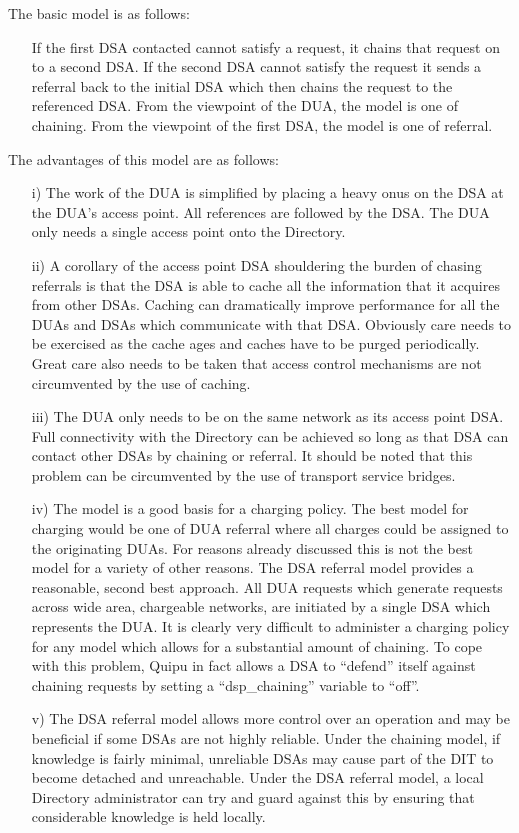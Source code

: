 The basic model is as follows:
\begin{itemize}
\item[{}]
If the first DSA contacted cannot satisfy a request, it chains that request
on to a second DSA.  If the second DSA cannot satisfy the request it sends a
referral back to the initial DSA which then chains the request to the
referenced
DSA.  From the viewpoint of the DUA, the model is one of chaining.  From the
viewpoint of the first DSA, the model is one of referral.

\end{itemize}
The advantages of this model are as follows:
\begin{itemize}
\item[{i)}]
The work of the DUA is simplified by placing a heavy onus on the DSA at 
the DUA's access point.  All references are
followed by the DSA.  The DUA only needs a single access point onto the
Directory.
\item[{ii)}]
A corollary of the access point DSA shouldering the burden of chasing
referrals is that the DSA is able to cache all the information that it
acquires from other DSAs.  Caching can dramatically improve performance for
all the DUAs and DSAs which communicate with that DSA.  Obviously care needs
to be exercised as the cache ages and caches have to be purged periodically.
Great care also needs to be taken that access control mechanisms are not
circumvented by the use of caching.
\item[{iii)}]
The DUA only needs to be on the same network as its access point DSA. Full
connectivity with the Directory can be achieved so long as that DSA can
contact other DSAs by chaining or referral.  It should be noted that this
problem can be circumvented by the use of transport service bridges.
\item[{iv)}]
The model is a good basis for a charging policy.  
The best model for charging would be one of DUA referral where all charges
could be assigned to the originating DUAs.  For reasons already discussed
this is not the best model for a variety of other reasons.  The DSA referral
model provides a reasonable, second best approach.
All DUA requests which
generate requests across wide area, chargeable networks, are initiated by a
single DSA which represents the DUA.  It is clearly very difficult to
administer a charging policy for any model which allows for a
substantial amount of chaining.
To cope with this problem, Quipu in fact allows a DSA to ``defend'' itself
against chaining requests by setting a ``dsp\_chaining'' variable to ``off''.
\item[{v)}]
The DSA referral model allows more control over an operation and may be
beneficial if some DSAs are not highly reliable.  Under the chaining model,
if knowledge is fairly minimal, unreliable DSAs may cause part of the DIT to
become detached and unreachable.  Under the DSA referral model, a local
Directory administrator can try and guard against this by ensuring that
considerable knowledge is held locally.
\end{itemize}
